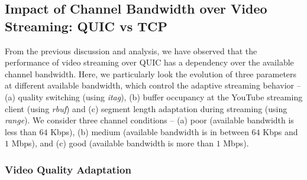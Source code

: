 \subsection{Impact of Channel Bandwidth over Video Streaming: QUIC vs TCP}
From the previous discussion and analysis, we have observed that the performance of video streaming over \ac{QUIC} has a dependency over the available channel bandwidth. 
Here, we particularly look the evolution of three parameters at different available bandwidth, which control the adaptive streaming behavior -- (a) quality switching (using \textit{itag}), (b) buffer occupancy at the YouTube streaming client (using \textit{rbuf}) and (c) segment length adaptation during streaming (using \textit{range}). We consider three channel conditions -- (a) poor (available bandwidth is less than $64$ Kbps), (b) medium (available bandwidth is in between $64$ Kbps and $1$ Mbps), and (c) good (available bandwidth is more than $1$ Mbps).

\subsubsection{Video Quality Adaptation}
%
%
%
%
%




